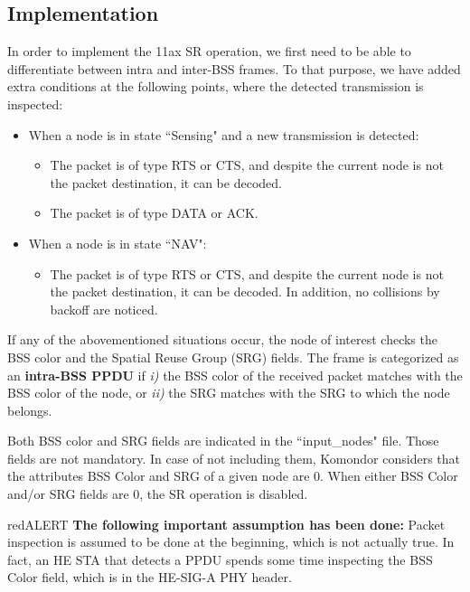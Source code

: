 \documentclass[]{article}
\begin{document}
	\subsection{Implementation}
	
	In order to implement the 11ax SR operation, we first need to be able to differentiate between intra and inter-BSS frames. To that purpose, we have added extra conditions at the following points, where the detected transmission is inspected:
	\begin{itemize}
		\item When a node is in state ``Sensing" and a new transmission is detected: 
		\begin{itemize}
			\item The packet is of type RTS or CTS, and despite the current node is not the packet destination, it can be decoded.
			\item The packet is of type DATA or ACK. 
		\end{itemize}
		\item When a node is in state ``NAV":
		\begin{itemize}
			\item The packet is of type RTS or CTS, and despite the current node is not the packet destination, it can be decoded. In addition, no collisions by backoff are noticed.
		\end{itemize}
	\end{itemize}
	
	If any of the abovementioned situations occur, the node of interest checks the BSS color and the Spatial Reuse Group (SRG) fields. The frame is categorized as an \textbf{intra-BSS PPDU} if \emph{i)} the BSS color of the received packet matches with the BSS color of the node, or \emph{ii)} the SRG matches with the SRG to which the node belongs. 
	
	Both BSS color and SRG fields are indicated in the ``input\_nodes" file. Those fields are not mandatory. In case of not including them, Komondor considers that the attributes BSS Color and SRG of a given node are 0. When either BSS Color and/or SRG fields are 0, the SR operation is disabled.
	
	\begin{mybox}{red}{ALERT}
		\textbf{The following important assumption has been done:} Packet inspection is assumed to be done at the beginning, which is not actually true. In fact, an HE STA that detects a PPDU spends some time inspecting the BSS Color field, which is in the HE-SIG-A PHY header.		
	\end{mybox}
	
\end{document}
